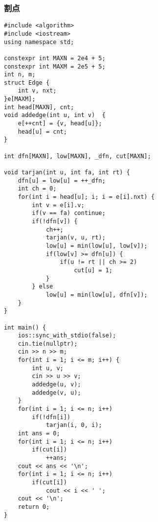 \documentclass{article}
\begin{document}
    \subsubsection{割点}
\begin{lstlisting}
#include <algorithm>
#include <iostream>
using namespace std;

constexpr int MAXN = 2e4 + 5;
constexpr int MAXM = 2e5 + 5;
int n, m;
struct Edge {
    int v, nxt;
}e[MAXM];
int head[MAXN], cnt;
void addedge(int u, int v)  {
    e[++cnt] = {v, head[u]};
    head[u] = cnt;
}

int dfn[MAXN], low[MAXN], _dfn, cut[MAXN];

void tarjan(int u, int fa, int rt) {
    dfn[u] = low[u] = ++_dfn;
    int ch = 0;
    for(int i = head[u]; i; i = e[i].nxt) {
        int v = e[i].v;
        if(v == fa) continue;
        if(!dfn[v]) {
            ch++;
            tarjan(v, u, rt);
            low[u] = min(low[u], low[v]);
            if(low[v] >= dfn[u]) {
                if(u != rt || ch >= 2)
                    cut[u] = 1;
            }
        } else
            low[u] = min(low[u], dfn[v]);
    }
}

int main() {
    ios::sync_with_stdio(false);
    cin.tie(nullptr);
    cin >> n >> m;
    for(int i = 1; i <= m; i++) {
        int u, v;
        cin >> u >> v;
        addedge(u, v);
        addedge(v, u);
    }
    for(int i = 1; i <= n; i++)
        if(!dfn[i])
            tarjan(i, 0, i);
    int ans = 0;
    for(int i = 1; i <= n; i++)
        if(cut[i])
            ++ans;
    cout << ans << '\n';
    for(int i = 1; i <= n; i++)
        if(cut[i])
            cout << i << ' ';
    cout << '\n';
    return 0;
}
\end{lstlisting}
\end{document}
